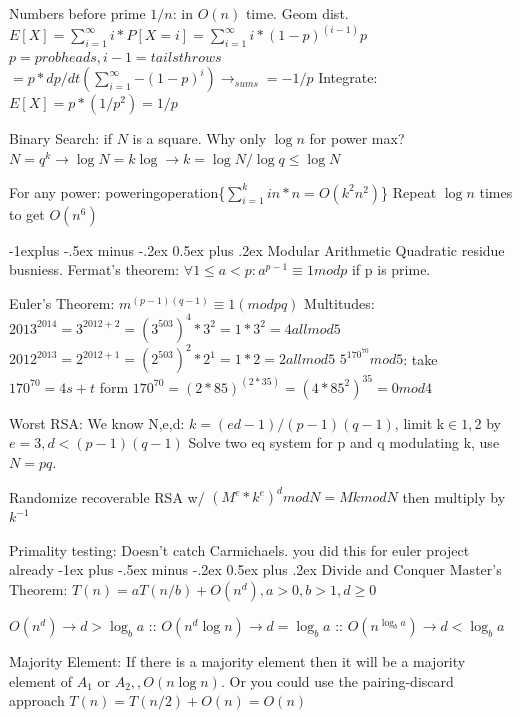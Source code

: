 \documentclass[10pt,landscape]{article}
\makeatletter
\renewcommand{\section}{\@startsection{section}{1}{0mm}%
                                {-1ex plus -.5ex minus -.2ex}%
                                {0.5ex plus .2ex}%
                                {\normalfont\large\bfseries}}
\renewcommand{\subsection}{\@startsection{subsection}{2}{0mm}%
                                {-1explus -.5ex minus -.2ex}%
                                {0.5ex plus .2ex}%
                                {\normalfont\normalsize\bfseries}}
\makeatother
\begin{document}
\begin{multicols}{3}
Numbers before prime $1/n$: in $O(n)$ time. Geom dist.$E[X]=\sum^{\infty}_{i=1}{i*P[X=i]}=\sum^{\infty}_{i=1}{i*(1-p)^{(i-1)}p}$ $p=probheads, i-1=tails throws$ 
$= p * dp/dt (\sum^{\infty}_{i=1}{-(1-p)^i})\rightarrow_{sums}=-1/p$ Integrate: $E[X]=p*(1/p^2)=1/p$ 

Binary Search: if $N$ is a square. Why only $\log n$ for power max? $N=q^k\rightarrow \log N=k\log \rightarrow k=\log N/\log q \leq \log N$ 

For any power: poweringoperation\{$\sum^{k}_{i=1}{in*n}=O(k^2n^2)$\} Repeat $\log n $ times to get $O(n^6)$

\subsection{Modular Arithmetic}
Quadratic residue busniess.
Fermat's theorem: $\forall 1\leq a < p: a^{p-1}\equiv1modp$ if p is prime.

Euler's Theorem: $m^{(p-1)(q-1)}\equiv 1 (mod pq)$
Multitudes: $2013^{2014}= 3^{2012+2}=(3^{503})^4*3^2=1*3^2=4 all mod 5$
$2012^{2013}=2^{2012+1}=(2^{503})^2*2^1=1*2=2 all mod 5$
$5^{170^{70}} mod 5$: take $170^{70}=4s+t$ form $170^{70}=(2*85)^{(2*35)}=(4*85^2)^{35}=0mod4$ 

Worst RSA: We know N,e,d: $k=(ed-1)/(p-1)(q-1)$, limit k$\in 1,2$ by $e=3,d<(p-1)(q-1)$ Solve two eq system for p and q modulating k, use $N=pq$.

Randomize recoverable RSA w/ $(M^e*k^e)^d mod N=MkmodN$ then multiply by $k^{-1}$

Primality testing: Doesn't catch Carmichaels. you did this for euler project already
\section{Divide and Conquer}
Master's Theorem: $T(n)=aT({n/b})+O(n^d),a>0,b>1,d\geq 0$

$O(n^d) \rightarrow d>\log_b{a}$ ::
$O(n^d\log n) \rightarrow d=\log_b{a}$ ::
$O(n^{\log_b{a}}) \rightarrow d<\log_b{a}$

Majority Element: If there is a majority element then it will be a majority element of $A_1$ or $A_2,, O(n\log n)$. Or you could use the pairing-discard approach $T(n)=T(n/2)+O(n)=O(n)$


\end{multicols}
\end{document}
